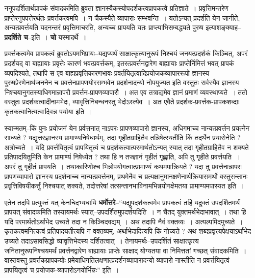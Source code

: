 \documentclass[article,12pt,a4paper]{memoir}
\begin{document}
	  \endgroup
	

	  \pstart ननूपदर्शितार्थप्रापकं संवादकमिति ब्रुवता ज्ञानस्यैकस्योपदर्शकत्वप्रापकत्वे प्रतिज्ञाते । प्रवृत्तिमन्तरेण प्राप्तेरनुपपत्तेरर्थतः प्रवर्त्तकत्वमपि । न चैकस्यैते व्यापाराः सम्भवन्ति । यतोऽन्यत् प्रदर्शति येन जानीते, अन्यत्प्रवर्त्तयति यदनन्तरं प्रवृत्तिमाचरति, अन्यच्च प्रापयति यतः प्राप्त्याभिसम्बद्ध्यते पुरुष इत्याशङ्क्याह--\textbf{प्रदर्शिते च}--इति । \textbf{चो} यस्मादर्थे ।
	\pend
      

	  \pstart प्रवर्त्तकत्वमेव प्रापकत्वं ब्रुवतोऽयमभिप्रायः--यद्यप्यर्थं साक्षात्कृत्यानुरूपं निश्चयं जनयत्प्रदर्शकं किञ्चित्, अपरं प्रदर्शयद् वा बाह्यायाः प्रवृत्तेः कारणं भवत्प्रवर्त्तकम्, इतरत्प्रवर्त्तनद्वारेण बाह्यायाः प्राप्तेर्निमित्तं भवत् प्रापकं व्यपदिश्यते, तथापि स एव बाह्यप्रवृत्तिकारणभावः प्रवर्तयितृत्वादिप्रयोजकव्यापाररूपो ज्ञानस्य पुरुषप्रेरणेनार्थजननेन च प्रवर्त्तनप्रापणयोरसम्भवेन प्रदर्शनादन्यो नोपयुज्यत इति वस्तुतः सर्वस्यैव ज्ञानस्य निश्चयानुगतस्याधिगमान्नापरौ प्रवर्त्तन-प्रापणव्यापारौ । अत एव तत्राद्यमेव ज्ञानं प्रमाणं व्यवस्थाप्यते । ततो वस्तुतः प्रदर्शकत्वादीनामभेदः, व्यावृत्तिनिबन्धनस्तु भेदोऽस्त्येव । अत एवैते प्रदर्शक-प्रवर्त्तक-प्रापकशब्दाः कृतकत्वानित्यत्वादिवन्न पर्याया इति ।
	\pend
      

	  \pstart स्यान्मतम्--किं पुनः प्रयोजनं येन प्रर्वत्तनात् नाऽपरः प्रापणव्यापारो ज्ञानस्य, अधिगमाच्च नान्यत्प्रवर्त्तन प्रयत्नेन साध्यते ? यद्युत्तरज्ञानस्य प्रामाण्यनिषेधार्थम्, तदा गृहीतग्राहितैव तन्निषेत्स्य\leavevmode{}तीति किं तदर्थेन प्रयासेनेति ? अत्रोच्यते । यदि प्रवर्त्तयितृत्वं प्रापयितृत्वं च प्रदर्शकत्वात्परमार्थतोऽन्यत् स्यात् तदा गृहीतग्राहितैव न शक्यते प्रतिपादयितुमिति केन प्रामाण्यं निषेध्येत ? तथा हि न तज्ज्ञानं गृहीतं गृह्णाति, अपि तु गृहीते प्रवर्त्तयति । अपरं तु गृहीतं प्रापयति । तथाकारिणोश्च भिन्नोपयोगत्वात्प्रामाण्यं कथमपाक्रियते ? यदा तु प्रवर्त्तनान्नापरः प्रापणव्यापारो ज्ञानस्य प्रदर्शनाच्च नान्यत्प्रवर्त्तनम्, प्रथमेनैव च प्रत्यक्षानुमानक्षणेनार्थक्रियासमर्थो वस्तुसन्तानः प्रवृत्तिविषयीकर्त्तुं निश्चयात् शक्यते, तदोत्तरेषां तत्सन्तानभाविनामभिन्नयोगक्षेमतया प्रामाण्यमपास्यत इति ।
	\pend
      

	  \pstart एतेन तदपि प्रत्युक्तं यत् केनचिदभ्यधायि \textbf{धर्मोत्तरे}--“यद्युपदर्शकत्वमेव प्रापकत्वं तर्हि यदुक्तं उपदर्शितमर्थं प्रापयत् संवादकमिति तस्यायमर्थः स्यात्--उपदर्शितमुपदर्शयदिति । न चैतद् युक्तमर्थभेदाभावात् । तथा हि यदि परमार्थतोऽर्थाभेद उच्यते तदा न किञ्चिदवद्यम् । अथ तदापि नैवं वक्तव्यः । अत्यल्पमिदमुच्यते । कृतकत्वमनित्यत्वं प्रतिपादयतीत्यपि न वक्तव्यम्, अर्थाभेदादित्यपि किं नोच्यते ? अथ शब्दप्रवृत्त्यपेक्षयाऽर्थाभेद उच्यते तदाऽसावसिद्धो व्यावृत्तिभेदस्य दर्शितत्वात् । तेनायमर्थः--उपदर्शितं साक्षात्कृत्य जनितानुरूपनिश्चयमर्थं प्रवर्त्तनद्वारेण बाह्यायाः प्राप्तेः साक्षाद् योग्यतया वा निमित्ततां गच्छत् संवादकमिति । वास्तवस्तु प्रवर्त्तकप्रापकयोः प्रमेयाधिगतिलक्षणात्प्रदर्शनव्यापारादन्यो व्यापारो नास्तीति न प्रवर्त्तयितृत्वं प्रापयितृत्वं च प्रयोजक-व्यापारोऽनयोर्भिन्नः” इति ।
	\pend
	  \bigskip
	  \begingroup
	
\end{document}
